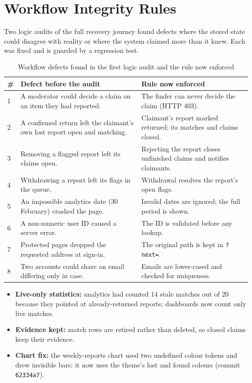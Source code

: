 \documentclass[12pt,a4paper,oneside]{report}
\newcommand{\code}[1]{\texttt{#1}}
\begin{document}
\section{Workflow Integrity Rules}
Two logic audits of the full recovery journey found defects where the stored state could disagree with reality or where the system claimed more than it knew. Each was fixed and is guarded by a regression test.
\begin{table}[H]
\centering\small
\caption{Workflow defects found in the first logic audit and the rule now enforced}
\begin{tabularx}{\textwidth}{P{4mm}X X}
\toprule
\# & Defect before the audit & Rule now enforced\\
 & A moderator could decide a claim on an item they had reported. & The finder can never decide the claim (HTTP 403).\\
2 & A confirmed return left the claimant's own lost report open and matching. & Claimant's report marked returned; its matches and claims closed.\\
3 & Removing a flagged report left its claims open. & Rejecting the report closes unfinished claims and notifies claimants.\\
4 & Withdrawing a report left its flags in the queue. & Withdrawal resolves the report's open flags.\\
5 & An impossible analytics date (30 February) crashed the page. & Invalid dates are ignored; the full period is shown.\\
6 & A non-numeric user ID caused a server error. & The ID is validated before any lookup.\\
7 & Protected pages dropped the requested address at sign-in. & The original path is kept in \code{?next=}.\\
8 & Two accounts could share an email differing only in case. & Emails are lower-cased and checked for uniqueness.\\
\bottomrule
\end{tabularx}
\end{table}
\begin{itemize}
  \item \textbf{Live-only statistics:} analytics had counted 14 stale matches out of 20 because they pointed at already-returned reports; dashboards now count only live matches.
  \item \textbf{Evidence kept:} match rows are retired rather than deleted, so closed claims keep their evidence.
  \item \textbf{Chart fix:} the weekly-reports chart used two undefined colour tokens and drew invisible bars; it now uses the theme's lost and found colours (commit \code{62334a7}).
\end{itemize}
\end{document}
